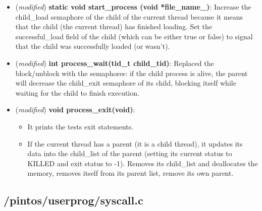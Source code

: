 \documentclass[11pt]{scrartcl}
\begin{document}
\begin{itemize}

    \item (\textit{modified}) \textbf{static void start\_process (void *file\_name\_)}:
          Increase the child\_load semaphore of the child of the current thread because it means that the child (the current thread) has finished loading. Set the successful\_load field of the child (which can be either true or false) to signal that the child was successfully loaded (or wasn't).

    \item (\textit{modified}) \textbf{int process\_wait(tid\_t child\_tid)}:
          Replaced the block/unblock with the semaphores: if the child process is alive, the parent will decrease the child\_exit semaphore of its child, blocking itself while waiting for the child to finish execution.
    \item (\textit{modified}) \textbf{void process\_exit(void)}:
    \begin{itemize}
        \item It prints the tests exit statements.
        \item If the current thread has a parent (it is a child thread), it updates its data into the child\_list of the parent (setting its current status to KILLED and exit status to -1). Removes its child\_list and deallocates the memory, removes itself from its parent list, remove its own parent.
    \end{itemize}
    
\end{itemize}




\subsection*{/pintos/userprog/syscall.c}
\end{document}
